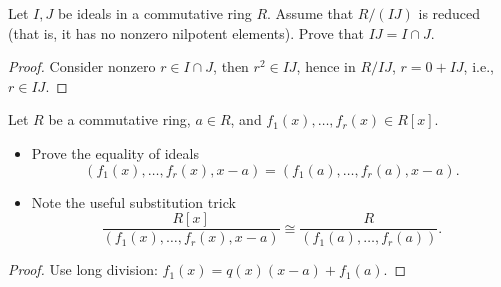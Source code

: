 \documentclass[openany]{book}
\begin{document}
\begin{prob}[4.6]
    Let \( I, J \) be ideals in a commutative ring \( R \). Assume that \( R/(IJ) \) is reduced (that is, it has no nonzero nilpotent elements). Prove that \( IJ = I \cap J \).
\end{prob}
\begin{proof}
    Consider nonzero $r\in I\cap J$, then $r^2\in IJ$, hence in $R/IJ$, $r=0+IJ$, i.e., $r\in IJ$.
\end{proof}


\begin{prob}[4.11]
    Let \( R \) be a commutative ring, \( a \in R \), and \( f_1(x), \ldots, f_r(x) \in R[x] \).
    \begin{itemize}
        \item Prove the equality of ideals
        \[ (f_1(x), \ldots, f_r(x), x - a) = (f_1(a), \ldots, f_r(a), x - a). \]
        \item Note the useful substitution trick
        \[ \frac{R[x]}{(f_1(x), \ldots, f_r(x), x - a)} \cong \frac{R}{(f_1(a), \ldots, f_r(a))}. \]
    \end{itemize}
\end{prob}
\begin{proof}
    Use long division: $f_1(x)=q(x)(x-a)+f_1(a)$.
\end{proof}
\end{document}
